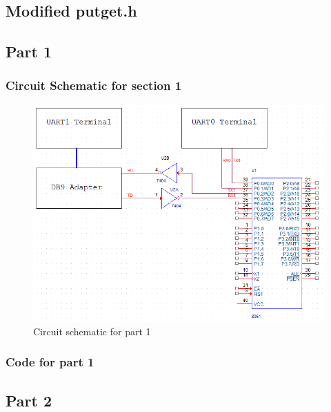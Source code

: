 \documentclass[12pt]{article}
\begin{document}
\subsection{Modified putget.h}
	
\subsection{Part 1}
	\subsubsection{Circuit Schematic for section 1}
		\begin{figure}[H]
			\centering
			\includegraphics[width=\textwidth]{Part1Schematic.png}
			\caption{Circuit schematic for part 1}
			\label{schematic1}
		\end{figure} 
		\pagebreak
	\subsubsection{Code for part 1}
		
\subsection{Part 2}
\end{document}
